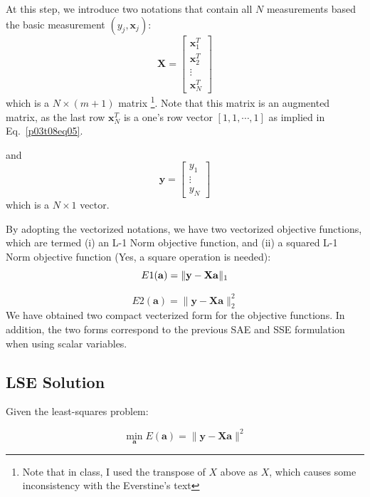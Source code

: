 \documentclass[12pt]{article}
\begin{document}
At this step, we introduce two notations that contain all $N$ measurements based the basic measurement $(y_j, \mathbf{x}_j)$:
\[
\mathbf{X} = \begin{bmatrix}
\mathbf{x}_1^T \\
\mathbf{x}_2^T \\
\vdots\\
\mathbf{x}_N^T    
\end{bmatrix}
\]
which is a $N \times (m+1)$ matrix \footnote{Note that in class, I used the transpose of $X$ above as $X$, which causes some inconsistency with the Everstine's text}. Note that this matrix is an augmented matrix, as the last row $\mathbf{x}_N^T$ is a one's row vector $[1, 1, \cdots, 1]$ as implied in Eq.~\ref{p03t08eq05}.


and 
\[
\mathbf{y} = \begin{bmatrix}
y_1 \\
\vdots\\
y_N 
\end{bmatrix}
\]
which is a $N \times 1$ vector.



By adopting the vectorized notations, we have two vectorized objective functions, which are termed (i) an L-1 Norm objective function, and (ii) a squared L-1 Norm objective function (Yes, a square operation is needed):
\begin{equation}
E1(\mathbf{a}) = \|\mathbf{y} - \mathbf{X} \mathbf{a} \|_1 \\
\label{p03t08eq08}
\end{equation}

\begin{equation}
E2(\mathbf{a}) = \|\mathbf{y} - \mathbf{X} \mathbf{a} \|_2^2
\label{p03t08eq09}
\end{equation}
We have obtained two compact vecterized form for the objective functions. In addition, the two forms correspond to the previous SAE and SSE formulation when using scalar variables.  



\subsection{LSE Solution}
Given the least-squares problem:

\begin{equation}
\min_{\mathbf{a}} E(\mathbf{a}) = \|\mathbf{y} - \mathbf{Xa} \|^2
\label{p03t08eq10}
\end{equation}
\end{document}

